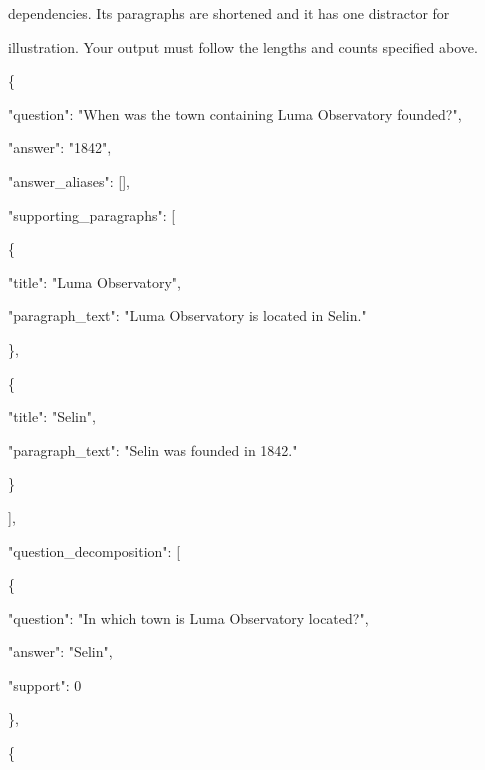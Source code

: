 \begin{promptbox}
dependencies. Its paragraphs are shortened and it has one distractor for\par
illustration. Your output must follow the lengths and counts specified above.\par
\{\par
\hspace*{1em}"question": "When was the town containing Luma Observatory founded?",\par
\hspace*{1em}"answer": "1842",\par
\hspace*{1em}"answer\_aliases": [],\par
\hspace*{1em}"supporting\_paragraphs": [\par
\hspace*{2em}\{\par
\hspace*{3em}"title": "Luma Observatory",\par
\hspace*{3em}"paragraph\_text": "Luma Observatory is located in Selin."\par
\hspace*{2em}\},\par
\hspace*{2em}\{\par
\hspace*{3em}"title": "Selin",\par
\hspace*{3em}"paragraph\_text": "Selin was founded in 1842."\par
\hspace*{2em}\}\par
\hspace*{1em}],\par
\hspace*{1em}"question\_decomposition": [\par
\hspace*{2em}\{\par
\hspace*{3em}"question": "In which town is Luma Observatory located?",\par
\hspace*{3em}"answer": "Selin",\par
\hspace*{3em}"support": 0\par
\hspace*{2em}\},\par
\hspace*{2em}\{\par

\end{promptbox}
